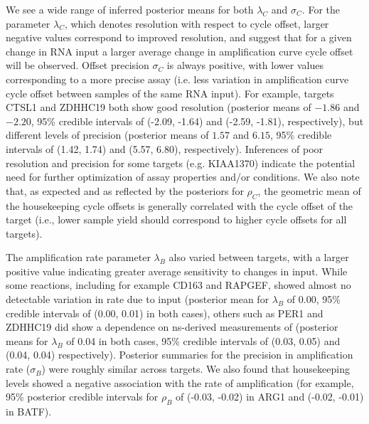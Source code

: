 \documentclass[../thesis.tex]{subfiles}
\begin{document}
We see a wide range of inferred posterior means for both $\lambda_C$ and $\sigma_C$. For the parameter $\lambda_C$, which denotes resolution with respect to cycle offset, larger negative values correspond to improved resolution, and suggest that for a given change in RNA input a larger average change in amplification curve cycle offset will be observed. Offset precision $\sigma_C$ is always positive, with lower values corresponding to a more precise assay (i.e. less variation in amplification curve cycle offset between samples of the same RNA input). For example, targets {CTSL1} and {ZDHHC19} both show good resolution (posterior means of $-1.86$ and $-2.20$, 95\% credible intervals of (-2.09, -1.64) and (-2.59, -1.81), respectively), but different levels of precision (posterior means of $1.57$ and $6.15$, 95\% credible intervals of (1.42, 1.74) and (5.57, 6.80), respectively). Inferences of poor resolution and precision for some targets (e.g. {KIAA1370}) indicate the potential need for further optimization of assay properties and/or conditions. We also note that, as expected and as reflected by the posteriors for $\rho_C$, the geometric mean of the housekeeping cycle offsets is generally correlated with the cycle offset of the target (i.e., lower sample yield should correspond to higher cycle offsets for all targets). 

The amplification rate parameter $\lambda_B$ also varied between targets, with a larger positive value indicating greater average sensitivity to changes in  input. While some reactions, including for example {CD163} and {RAPGEF}, showed almost no detectable variation in rate due to  input (posterior mean for $\lambda_B$ of 0.00, 95\% credible intervals of (0.00, 0.01) in both cases), others such as {PER1} and {ZDHHC19} did show a dependence on \gls{ns}-derived measurements of  (posterior means for $\lambda_B$ of 0.04 in both cases, 95\% credible intervals of (0.03, 0.05) and (0.04, 0.04) respectively). Posterior summaries for the precision in amplification rate ($\sigma_{B}$) were roughly similar across targets. We also found that housekeeping levels showed a negative association with the rate of amplification (for example, 95\% posterior credible intervals for $\rho_B$ of (-0.03, -0.02) in ARG1 and (-0.02, -0.01) in BATF).
\end{document}
